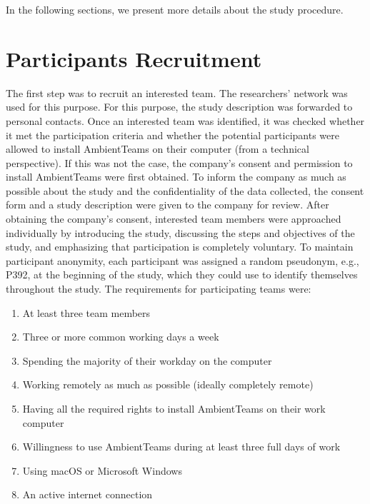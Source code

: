 In the following sections, we present more details about the study procedure.

\section{Participants Recruitment}
\label{section:recruitment}
The first step was to recruit an interested team. The researchers' network was used for this purpose. For this purpose, the study description was forwarded to personal contacts. Once an interested team was identified, it was checked whether it met the participation criteria and whether the potential participants were allowed to install AmbientTeams on their computer (from a technical perspective). If this was not the case, the company's consent and permission to install AmbientTeams were first obtained. To inform the company as much as possible about the study and the confidentiality of the data collected, the consent form and a study description were given to the company for review. After obtaining the company's consent, interested team members were approached individually by introducing the study, discussing the steps and objectives of the study, and emphasizing that participation is completely voluntary. To maintain participant anonymity, each participant was assigned a random pseudonym, e.g., P392, at the beginning of the study, which they could use to identify themselves throughout the study. The requirements for participating teams were:

\begin{enumerate}
    \item At least three team members
    \item Three or more common working days a week
    \item Spending the majority of their workday on the computer
    \item Working remotely as much as possible (ideally completely remote)
    \item Having all the required rights to install AmbientTeams on their work computer
    \item Willingness to use AmbientTeams during at least three full days of work
    \item Using macOS or Microsoft Windows
    \item An active internet connection
\end{enumerate}

